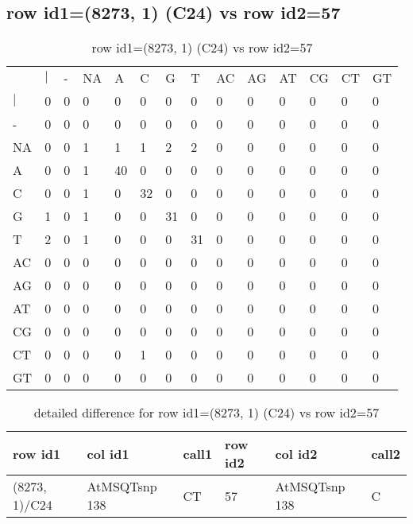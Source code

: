\subsection{row id1=(8273, 1) (C24) vs row id2=57}
\begin{center}
\begin{longtable}{|l|l|l|l|l|l|l|l|l|l|l|l|l|l|}
\caption{row id1=(8273, 1) (C24) vs row id2=57} \label{table_dm228}\\
\hline
\\
\hline
&$|$&-&NA&A&C&G&T&AC&AG&AT&CG&CT&GT\\
$|$&0&0&0&0&0&0&0&0&0&0&0&0&0\\
-&0&0&0&0&0&0&0&0&0&0&0&0&0\\
NA&0&0&1&1&1&2&2&0&0&0&0&0&0\\
A&0&0&1&40&0&0&0&0&0&0&0&0&0\\
C&0&0&1&0&32&0&0&0&0&0&0&0&0\\
G&1&0&1&0&0&31&0&0&0&0&0&0&0\\
T&2&0&1&0&0&0&31&0&0&0&0&0&0\\
AC&0&0&0&0&0&0&0&0&0&0&0&0&0\\
AG&0&0&0&0&0&0&0&0&0&0&0&0&0\\
AT&0&0&0&0&0&0&0&0&0&0&0&0&0\\
CG&0&0&0&0&0&0&0&0&0&0&0&0&0\\
CT&0&0&0&0&1&0&0&0&0&0&0&0&0\\
GT&0&0&0&0&0&0&0&0&0&0&0&0&0\\
\hline
\end{longtable}
\end{center}

\begin{center}
\begin{longtable}{|l|l|l|l|l|l|}
\caption{detailed difference for row id1=(8273, 1) (C24) vs row id2=57} \label{table_dm229}\\
\hline
row id1&col id1&call1&row id2&col id2&call2\\
\hline
(8273, 1)/C24&AtMSQTsnp 138&CT&57&AtMSQTsnp 138&C\\
\hline
\end{longtable}
\end{center}

